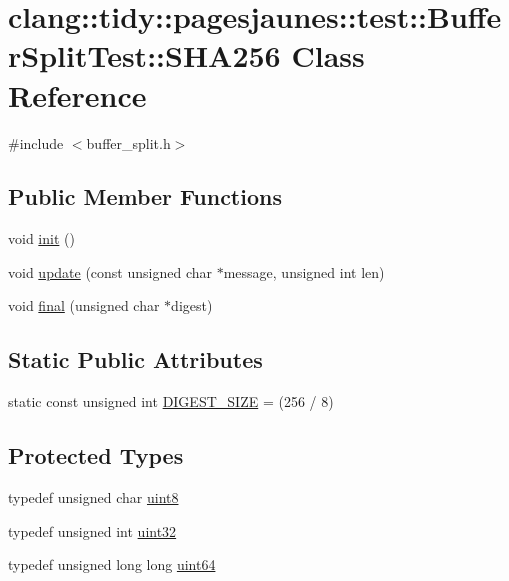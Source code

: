 \hypertarget{classclang_1_1tidy_1_1pagesjaunes_1_1test_1_1_buffer_split_test_1_1_s_h_a256}{}\section{clang\+:\+:tidy\+:\+:pagesjaunes\+:\+:test\+:\+:Buffer\+Split\+Test\+:\+:S\+H\+A256 Class Reference}
\label{classclang_1_1tidy_1_1pagesjaunes_1_1test_1_1_buffer_split_test_1_1_s_h_a256}


{\ttfamily \#include $<$buffer\+\_\+split.\+h$>$}

\subsection*{Public Member Functions}
\begin{DoxyCompactItemize}
\item 
void \hyperlink{classclang_1_1tidy_1_1pagesjaunes_1_1test_1_1_buffer_split_test_1_1_s_h_a256_a675218f3f34cc88eaf81668db0c507e9}{init} ()
\item 
void \hyperlink{classclang_1_1tidy_1_1pagesjaunes_1_1test_1_1_buffer_split_test_1_1_s_h_a256_a7fbab90c24ec27e25ec43c5f91dc5d70}{update} (const unsigned char $\ast$message, unsigned int len)
\item 
void \hyperlink{classclang_1_1tidy_1_1pagesjaunes_1_1test_1_1_buffer_split_test_1_1_s_h_a256_a2b08353f629a883cba24db56131354ba}{final} (unsigned char $\ast$digest)
\end{DoxyCompactItemize}
\subsection*{Static Public Attributes}
\begin{DoxyCompactItemize}
\item 
static const unsigned int \hyperlink{classclang_1_1tidy_1_1pagesjaunes_1_1test_1_1_buffer_split_test_1_1_s_h_a256_a5bc8c8049db25b1fd722b7a0a6cb2a3a}{D\+I\+G\+E\+S\+T\+\_\+\+S\+I\+ZE} = (256 / 8)
\end{DoxyCompactItemize}
\subsection*{Protected Types}
\begin{DoxyCompactItemize}
\item 
typedef unsigned char \hyperlink{classclang_1_1tidy_1_1pagesjaunes_1_1test_1_1_buffer_split_test_1_1_s_h_a256_a00a54ee6bd0ad37eaaf9e32e55b16377}{uint8}
\item 
typedef unsigned int \hyperlink{classclang_1_1tidy_1_1pagesjaunes_1_1test_1_1_buffer_split_test_1_1_s_h_a256_add2f6d098907647a38f2946b5a42269b}{uint32}
\item 
typedef unsigned long long \hyperlink{classclang_1_1tidy_1_1pagesjaunes_1_1test_1_1_buffer_split_test_1_1_s_h_a256_a834fcfaaa3e4dda362246365021c9e3e}{uint64}
\end{DoxyCompactItemize}
